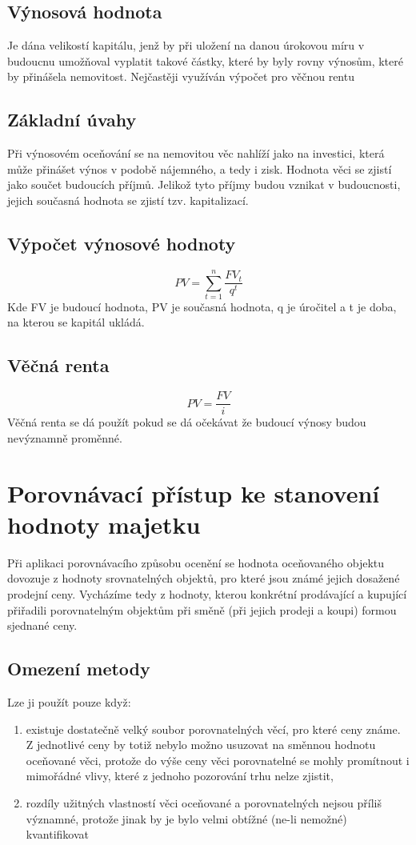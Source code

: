 \subsection{Výnosová hodnota}
Je dána velikostí kapitálu, jenž by při uložení na danou úrokovou míru v budoucnu umožňoval vyplatit takové částky, které by byly rovny výnosům, které
by přinášela nemovitost. Nejčastěji využíván výpočet pro věčnou rentu
\subsection{Základní úvahy}
Při výnosovém oceňování se na nemovitou věc nahlíží jako na investici, která může přinášet výnos v podobě nájemného, a tedy i zisk. Hodnota věci se
zjistí jako součet budoucích příjmů. Jelikož tyto příjmy budou vznikat v budoucnosti, jejich současná hodnota se zjistí tzv. kapitalizací.

\subsection{Výpočet výnosové hodnoty}
\begin{equation}
    PV = \sum_{t=1}^{n}\frac{FV_t}{q^t}
\end{equation}
Kde FV je budoucí hodnota, PV je současná hodnota, q je úročitel a t je doba, na kterou se kapitál ukládá.
\subsection{Věčná renta}
\begin{equation}
    PV = \frac{FV}{i}
\end{equation}
Věčná renta se dá použít pokud se dá očekávat že budoucí výnosy budou nevýznamně proměnné.

\section{Porovnávací přístup ke stanovení hodnoty majetku}
Při aplikaci porovnávacího způsobu ocenění se hodnota oceňovaného objektu dovozuje z hodnoty srovnatelných objektů, pro
které jsou známé jejich dosažené prodejní ceny. Vycházíme tedy z hodnoty, kterou konkrétní prodávající a kupující přiřadili porovnatelným objektům při směně (při
jejich prodeji a koupi) formou sjednané ceny.
\subsection{Omezení metody}
Lze ji použít pouze když:
\begin{enumerate}
    \item existuje dostatečně velký soubor porovnatelných věcí, pro které ceny
    známe. Z jednotlivé ceny by totiž nebylo možno usuzovat na směnnou
    hodnotu oceňované věci, protože do výše ceny věci porovnatelné se mohly
    promítnout i mimořádné vlivy, které z jednoho pozorování trhu nelze zjistit,
    \item rozdíly užitných vlastností věci oceňované a porovnatelných nejsou příliš
    významné, protože jinak by je bylo velmi obtížné (ne-li nemožné)
    kvantifikovat
\end{enumerate}
